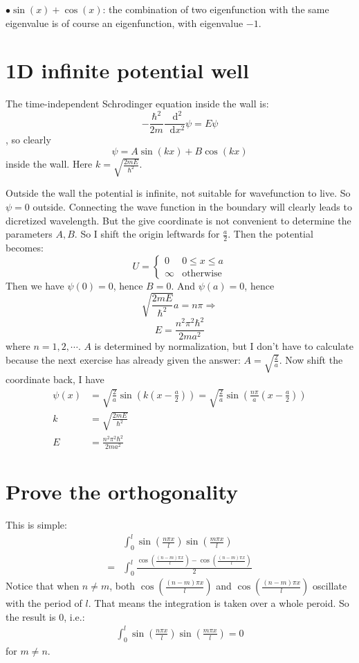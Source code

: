 \documentclass{article}
\newcommand*\diff{\mathop{}\!\mathrm{d}}
\numberwithin{equation}{subsection} %
\theoremstyle{definition}
\begin{document}
$\bullet \sin(x)+\cos(x)$: the combination of two eigenfunction with
the same eigenvalue is of course an eigenfunction, with eigenvalue
$-1$.

\section{1D infinite potential well}
The time-independent Schrodinger equation inside the wall is:
$$ -\frac{\hbar^2}{2m} \frac{\diff^2}{\diff x^2} \psi = E\psi$$,
so clearly
$$\psi = A \sin(kx) + B\cos(kx)$$
inside the wall. Here $k=\sqrt{\frac{2mE}{\hbar^2}}$.

Outside the wall the potential is infinite, not suitable for
wavefunction to live. So $\psi=0$ outside. Connecting the wave
function in the boundary will clearly leads to dicretized wavelength.
But the give coordinate is not convenient to determine the parameters
$A,B$. So I shift the origin leftwards for $\frac{a}{2}$. Then the
potential becomes:
$$
U = \begin{cases}
    0& 0\leq x\leq a \\
    \infty& \text{otherwise}
\end{cases}
$$
Then we have $\psi(0)=0$, hence $B=0$. And $\psi(a)=0$, hence
$$ \sqrt{\frac{2mE}{\hbar^2}} a = n\pi \Rightarrow$$
$$ E = \frac{n^2\pi^2\hbar^2}{2ma^2}$$
where $n=1,2,\cdots$. $A$ is determined by normalization, but I don't
have to calculate because the next exercise has already given the
answer: $A = \sqrt{\frac{2}{a}}$. Now shift the coordinate back, I
have
\begin{align}
    \psi(x) &= \sqrt{\frac{2}{a}}\sin\left(k(x-\frac{a}{2})\right)
            =\sqrt{\frac{2}{a}}
                \sin\left(\frac{n\pi}{a}(x-\frac{a}{2})\right)\\
    k       &= \sqrt{\frac{2mE}{\hbar^2}}\\
    E       &= \frac{n^2\pi^2\hbar^2}{2ma^2}
\end{align}

\section{Prove the orthogonality}
This is simple:
\begin{align*}
    &\int_{0}^{l} \sin(\frac{n\pi x}{l}) \sin(\frac{m\pi x}{l})\\
    =& \int_{0}^{l} \frac{ 
        \cos(\frac{(n-m)\pi x}{l}) - \cos(\frac{(n-m)\pi x}{l})
        } {2}
\end{align*}
Notice that when $n\neq m$, both $\cos(\frac{(n-m)\pi x}{l})$ and
$\cos(\frac{(n-m)\pi x}{l})$ oscillate with the period of $l$. That
means the integration is taken over a whole peroid. So the result is
$0$, i.e.:
\begin{align}
    \int_{0}^{l} \sin(\frac{n\pi x}{l}) \sin(\frac{m\pi x}{l})=0
\end{align}
for $m\neq n$.
\end{document}
